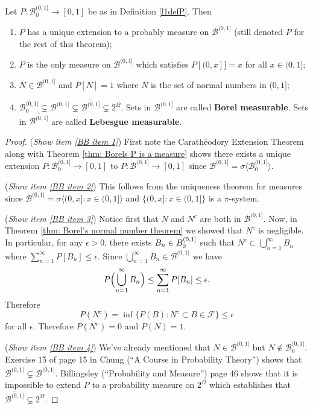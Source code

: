 \begin{theorem}
Let $P:\mathcal B_0^{(0,1]}\rightarrow [0,1]$ be as in Definition \ref{l1defP}. Then
\begin{enumerate}
\item\label{BB item 1} $P$ has a unique extension to a probably measure  on $\mathcal B^{(0,1]}$ (still denoted $P$ for the rest of this theorem);
\item\label{BB item 2} $P$ is the only measure on  $\mathcal B^{(0,1]}$ which satisfies $P[(0,x]]=x$ for all $x\in (0,1]$;
\item\label{BB item 3} $N\in \mathcal B^{(0,1]}$ and $P[N]=1$ where $N$ is the set of normal numbers in $(0,1]$;
\item\label{BB item 4} $\mathcal B_0^{(0,1]} \subsetneq \mathcal B^{(0,1]} \subsetneq  \overline{\mathcal B^{(0,1]}}\subsetneq 2^\Omega$. Sets in $\mathcal B^{(0,1]}$ are called {\bf Borel measurable}. Sets in $\overline{\mathcal B^{(0,1]}}$ are called {\bf Lebesgue measurable}.
\end{enumerate}
\end{theorem}

\begin{proof}
({\sl Show item \ref{BB item 1}}) First note the Carath\'eodory Extension Theorem  along with Theorem \ref{thm: Borels P is a measure} shows there exists a unique extension $P:\mathcal B_0^{(0,1]}\rightarrow [0,1]$ to $P:\mathcal B^{(0,1]}\rightarrow [0,1]$ since $\mathcal B^{(0,1]}=\sigma\bigl\langle \mathcal B_0^{(0,1]} \bigr\rangle$.

({\sl Show item \ref{BB item 2}}) This follows from the uniqueness theorem for measures since $\mathcal B^{(0,1]} = \sigma\langle  (0,x]\colon x\in (0,1]\rangle$ and $\{(0,x]\colon x\in (0,1] \}$ is a $\pi$-system.


({\sl Show item \ref{BB item 3}})
Notice first that $N$ and $N^c$ are both in $\mathcal B^{(0,1]}$.
Now, in Theorem \ref{thm: Borel's normal number theorem} we showed that $N^c$ is negligible. In particular, for any $\epsilon >0$, there exists $B_n\in \mathcal \mathcal B_0^{(0,1]}$ such that $N^c\subset \bigcup_{n=1}^\infty B_n$ where  $\sum_{n=1}^\infty P[B_n]\leq \epsilon$. Since  $\bigcup_{n=1}^\infty B_n\in \mathcal B^{(0,1]} $ we have
\[P\Bigl(\bigcup_{n=1}^\infty B_n\Bigr)\leq \sum_{n=1}^\infty P[B_n]\leq \epsilon. \]
Therefore
\[P(N^c)= \inf\{P(B)\colon N^c\subset B\in \mathcal F  \}\leq \epsilon  \]
for all $\epsilon$. Therefore $P(N^c)=0$ and $P(N)=1$.


({\sl Show item \ref{BB item 4}}) We've already mentioned that $N\in \mathcal B^{(0,1]}$ but $N\notin \mathcal B_0^{(0,1]}$. Exercise 15 of page 15 in Chung (``A Course in Probability Theory'') shows that $\mathcal B^{(0,1]} \subsetneq  \overline{\mathcal B^{(0,1]}}$. Billingsley (``Probability and Measure'') page 46 shows that it is impossible to extend $P$ to a probability measure on $2^\Omega$ which establishes that $ \overline{\mathcal B^{(0,1]}}\subsetneq 2^\Omega$.

\end{proof}




